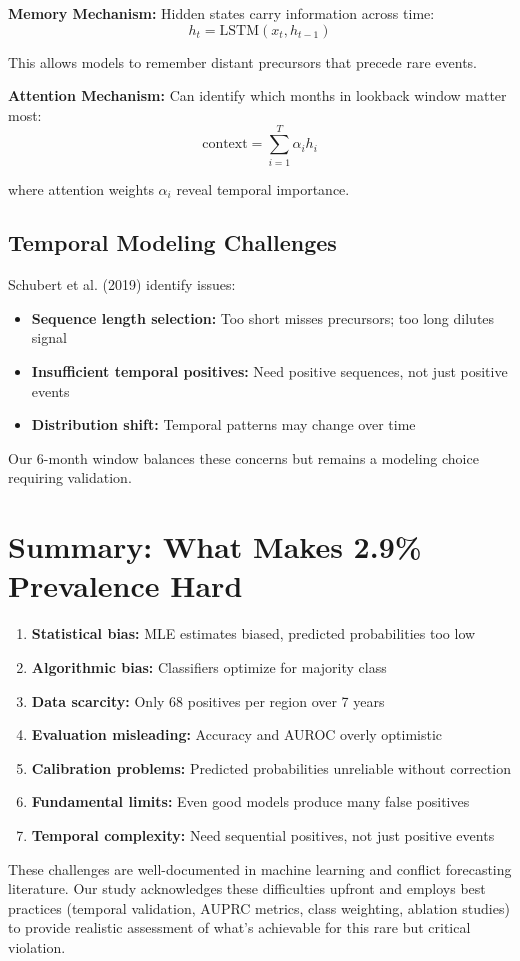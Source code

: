 \documentclass{article}
\begin{document}
\textbf{Memory Mechanism:} Hidden states carry information across time:
\begin{equation}
h_t = \text{LSTM}(x_t, h_{t-1})
\end{equation}

This allows models to remember distant precursors that precede rare events.

\textbf{Attention Mechanism:} Can identify which months in lookback window matter most:
\begin{equation}
\text{context} = \sum_{i=1}^{T} \alpha_i h_i
\end{equation}

where attention weights $\alpha_i$ reveal temporal importance.

\subsection{Temporal Modeling Challenges}

Schubert et al. (2019) identify issues:
\begin{itemize}
    \item \textbf{Sequence length selection:} Too short misses precursors; too long dilutes signal
    \item \textbf{Insufficient temporal positives:} Need positive sequences, not just positive events
    \item \textbf{Distribution shift:} Temporal patterns may change over time
\end{itemize}

Our 6-month window balances these concerns but remains a modeling choice requiring validation.

\section{Summary: What Makes 2.9\% Prevalence Hard}

\begin{enumerate}
    \item \textbf{Statistical bias:} MLE estimates biased, predicted probabilities too low
    \item \textbf{Algorithmic bias:} Classifiers optimize for majority class
    \item \textbf{Data scarcity:} Only 68 positives per region over 7 years
    \item \textbf{Evaluation misleading:} Accuracy and AUROC overly optimistic
    \item \textbf{Calibration problems:} Predicted probabilities unreliable without correction
    \item \textbf{Fundamental limits:} Even good models produce many false positives
    \item \textbf{Temporal complexity:} Need sequential positives, not just positive events
\end{enumerate}

These challenges are well-documented in machine learning and conflict forecasting literature. Our study acknowledges these difficulties upfront and employs best practices (temporal validation, AUPRC metrics, class weighting, ablation studies) to provide realistic assessment of what's achievable for this rare but critical violation.
\end{document}

